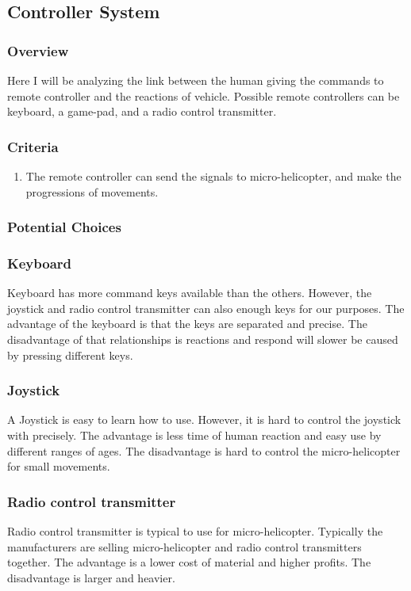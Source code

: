 \documentclass[onecolumn, draftclsnofoot,10pt, compsoc]{IEEEtran}
\begin{document}
\subsection{Controller System}

\subsubsection{Overview}
Here I will be analyzing the link between the human giving the commands to remote controller and the reactions of vehicle. Possible remote controllers can be keyboard, a game-pad, and a radio control transmitter.

\subsubsection{Criteria}
\begin{enumerate}
\item{The remote controller can send the signals to micro-helicopter, and make the progressions of movements.}
\end{enumerate}

\subsubsection{Potential Choices}

\subsubsection{Keyboard}
Keyboard has more command keys available than the others. However, the joystick and radio control transmitter can also enough keys for our purposes. The advantage of the keyboard is that the keys are separated and precise. The disadvantage of that relationships is reactions and respond will slower be caused by pressing different keys.

\subsubsection{Joystick}
A Joystick is easy to learn how to use. However, it is hard to control the joystick with precisely. The advantage is less time of human reaction and easy use by different ranges of ages. The disadvantage is hard to control the micro-helicopter for small movements.

\subsubsection{Radio control transmitter}
Radio control transmitter is typical to use for micro-helicopter. Typically the manufacturers are selling micro-helicopter and radio control transmitters together. The advantage is a lower cost of material and higher profits. The disadvantage is larger and heavier.
\end{document}

